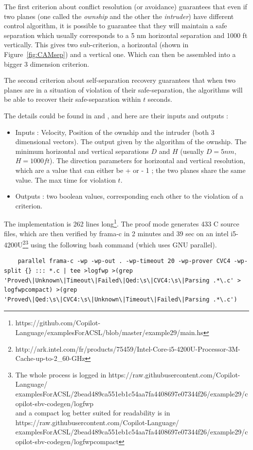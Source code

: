 \documentclass[a4paper,11pt,final]{article}
\begin{document}
	The first criterion about conflict resolution (or avoidance) guarantees that even if two planes (one called the \emph{ownship} and the other the \emph{intruder}) have different control algorithm, it is possible to guarantee that they will maintain a safe separation which usually corresponds to a 5 nm horizontal separation and 1000 ft vertically. This gives two sub-criterion, a horizontal (shown in Figure~\ref{fig:CAMsep}) and a vertical one. Which can then be assembled into a bigger 3 dimension criterion.
	
	The second criterion about self-separation recovery guarantees that when two planes are in a situation of violation of their safe-separation, the algorithms will be able to recover their safe-separation within $t$ seconds.
	
	The details could be found in \cite{MBNMH2010NASA} and \cite{NM2011NASA}, and here are their inputs and outputs :
	\begin{itemize}
		\item Inputs : Velocity, Position of the ownship and the intruder (both 3 dimensional vectors). The output given by the algorithm of the ownship. The minimum horizontal and vertical separations $D$ and $H$ (usually $D = 5nm$, $H=1000ft$). The direction parameters for horizontal and vertical resolution, which are a value that can either be + or - 1 ; the two planes share the same value. The max time for violation $t$.
		\item Outputs : two boolean values, corresponding each other to the violation of a criterion.
	\end{itemize}
	
	The implementation is 262 lines long\footnote{https://github.com/Copilot-Language/examplesForACSL/blob/master/example29/main.hs}. The proof mode generates 433 C source files, which are then verified by frama-c in 2 minutes and 39 sec on an intel i5-4200U\footnote{http://ark.intel.com/fr/products/75459/Intel-Core-i5-4200U-Processor-3M-Cache-up-to-2\_60-GHz}\footnote{The whole process is logged in  https://raw.githubusercontent.com/Copilot-Language/\\examplesForACSL/2bead489ca551eb1c54aa7fa4408697e07344f26/example29/copilot-sbv-codegen/logfwp \\ and a compact log better suited for readability is in  https://raw.githubusercontent.com/Copilot-Language/\\examplesForACSL/2bead489ca551eb1c54aa7fa4408697e07344f26/example29/copilot-sbv-codegen/logfwpcompact} using the following bash command (which uses GNU parallel).
	\begin{lstlisting}
	parallel frama-c -wp -wp-out . -wp-timeout 20 -wp-prover CVC4 -wp-split {} ::: *.c | tee >logfwp >(grep 'Proved\|Unknown\|Timeout\|Failed\|Qed:\s\|CVC4:\s\|Parsing .*\.c' > logfwpcompact) >(grep 'Proved\|Qed:\s\|CVC4:\s\|Unknown\|Timeout\|Failed\|Parsing .*\.c')
	\end{lstlisting}
	
\end{document}
